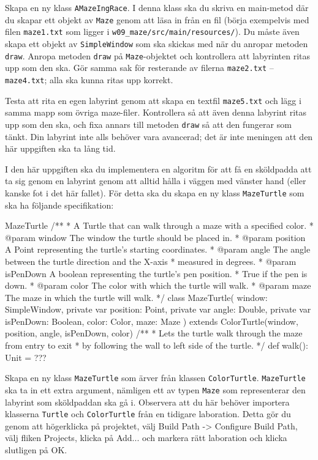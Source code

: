 \Subtask Skapa en ny klass \texttt{AMazeIngRace}. I denna klass ska du skriva en main-metod där du skapar ett objekt av \texttt{Maze} genom att läsa in från en fil (börja exempelvis med filen \texttt{maze1.txt} som ligger i \texttt{w09\_maze/src/main/resources/}). Du måste även skapa ett objekt av \texttt{SimpleWindow} som ska skickas med när du anropar metoden \texttt{draw}. Anropa  metoden \texttt{draw} på \texttt{Maze}-objektet och kontrollera att labyrinten ritas upp som den ska. Gör samma sak för resterande av filerna \texttt{maze2.txt} -- \texttt{maze4.txt}; alla ska kunna ritas upp korrekt.

\Subtask Testa att rita en egen labyrint genom att skapa en textfil \texttt{maze5.txt} och lägg i samma mapp som övriga maze-filer. Kontrollera så att även denna labyrint ritas upp som den ska, och fixa annars till metoden \texttt{draw} så att den fungerar som tänkt. Din labyrint inte alls behöver vara avancerad; det är inte meningen att den här uppgiften ska ta lång tid.


\Task I den här uppgiften ska du implementera en algoritm för att få en sköldpadda att ta sig genom en labyrint genom att alltid hålla i väggen med vänster hand (eller kanske fot i det här fallet). För detta ska du skapa en ny klass \texttt{MazeTurtle} som ska ha följande specifikation:

\begin{ScalaSpec}{MazeTurtle}
/**
 * A Turtle that can walk through a maze with a specified color.
 * @param window    The window the turtle should be placed in.
 * @param position  A Point representing the turtle's starting coordinates.
 * @param angle     The angle between the turtle direction and the X-axis 
 *                  measured in degrees.
 * @param isPenDown A boolean representing the turtle's pen position. 
 *                  True if the pen is down.
 * @param color     The color with which the turtle will walk.
 * @param maze      The maze in which the turtle will walk.
 */
class MazeTurtle(
    window: SimpleWindow, 
    private var position: Point,
    private var angle: Double, 
    private var isPenDown: Boolean,
    color: Color, 
    maze: Maze
  ) extends ColorTurtle(window, position, angle, isPenDown, color) {
  /**
   * Lets the turtle walk through the maze from entry to exit 
   * by following the wall to left side of the turtle.
   */
  def walk(): Unit = ???
}

\end{ScalaSpec}

\Subtask Skapa en ny klass \texttt{MazeTurtle} som ärver från klassen \texttt{ColorTurtle}. \texttt{MazeTurtle} ska ta in ett extra argument, nämligen ett av typen \texttt{Maze} som representerar den labyrint som sköldpaddan ska gå i. Observera att du här behöver importera klasserna \texttt{Turtle} och \texttt{ColorTurtle} från en tidigare laboration. Detta gör du genom att högerklicka på projektet, välj Build Path -> Configure Build Path, välj fliken Projects, klicka på Add... och markera rätt laboration och klicka slutligen på OK.

